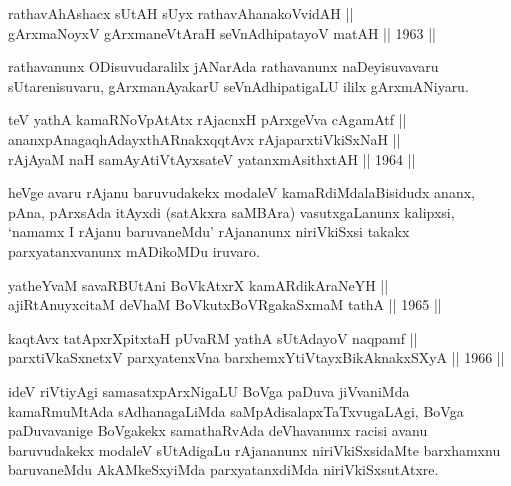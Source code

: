 
\begin{shl}
rathavAhAshacx sUtAH sUyx rathavAhanakoVvidAH || \\
gArxmaNoyxV gArxmaneVtAraH seVnAdhipatayoV matAH \hfill || 1963 ||
  
\end{shl}

\begin{artha}
rathavanunx ODisuvudaralilx jANarAda rathavanunx naDeyisuvavaru
sUtarenisuvaru, gArxmanAyakarU seVnAdhipatigaLU ililx gArxmANiyaru.
\end{artha}

\begin{shl}
teV yathA kamaRNoVpAtAtx rAjacnxH pArxgeVva cA\s \s gamAtf || \\
ananxpAnagaqhAdayxthARnakxqqtAvx rAjaparxtiVkiSxNaH || \\
rAjA\s yaM naH samAyAtiVtAyxsateV yatanxmAsithxtAH \hfill || 1964 ||
 
\end{shl} 

\begin{artha}
heVge avaru rAjanu baruvudakekx modaleV kamaRdiMdalaBisidudx ananx, pAna,
pArxsAda itAyxdi (satAkxra saMBAra) vasutxgaLanunx kalipxsi, `namamx I
rAjanu baruvaneMdu' rAjananunx niriVkiSxsi takakx parxyatanxvanunx
mADikoMDu iruvaro.
\end{artha}


\begin{shl}
yatheYvaM \footnotemark[1]savaRBUtAni BoVkAtxrX kamARdikAraNeYH || \\
ajiRtAnuyxcitaM deVhaM BoVkutxBoVRgakaSxmaM tathA \hfill || 1965 ||
  
\end{shl}

\begin{shl}
kaqtAvx tatApxrXpitxtaH pUvaRM yathA sUtAdayoV naqpamf || \\
parxtiVkaSxnetxV parxyatenxVna barxhemxYtiVtayxBikAknakxSXyA \hfill || 1966 ||
  
\end{shl}

\begin{artha}
ideV riVtiyAgi samasatxpArxNigaLU BoVga paDuva jiVvaniMda kamaRmuMtAda
sAdhanagaLiMda saMpAdisalapxTaTxvugaLAgi, BoVga paDuvavanige BoVgakekx
samathaRvAda deVhavanunx racisi avanu baruvudakekx modaleV sUtAdigaLu
rAjananunx niriVkiSxsidaMte barxhamxnu baruvaneMdu AkAMkeSxyiMda
parxyatanxdiMda niriVkiSxsutAtxre.
\end{artha}


